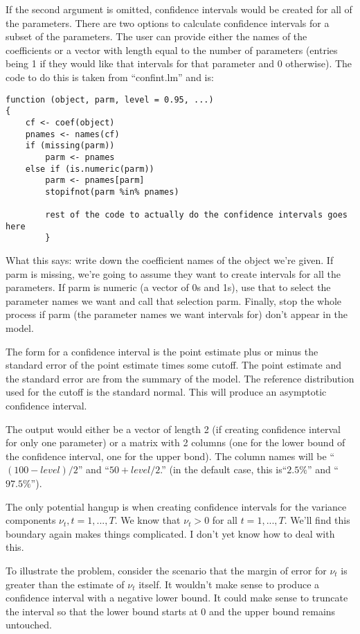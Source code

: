 \documentclass{article}
\begin{document}
If the second argument is omitted, confidence intervals would be created for all of the parameters. There are two options to calculate confidence intervals for a subset of the parameters. The user can provide either  the names of the coefficients or a vector with length equal to the number of parameters (entries being 1 if they would like that intervals for that parameter and 0 otherwise).  The code to do this is taken from ``confint.lm'' and is:
\begin{verbatim}
function (object, parm, level = 0.95, ...) 
{
    cf <- coef(object)
    pnames <- names(cf)
    if (missing(parm)) 
        parm <- pnames
    else if (is.numeric(parm)) 
        parm <- pnames[parm]
        stopifnot(parm %in% pnames)
        
        rest of the code to actually do the confidence intervals goes here
        }
\end{verbatim}
What this says: write down the coefficient names of the object we're given. If parm is missing, we're going to assume they want to create intervals for all the parameters.  If parm is numeric (a vector of 0s and 1s), use that to select the parameter names we want and call that selection parm.  Finally, stop the whole process if parm (the parameter names we want intervals for) don't appear in the model.

The form for a confidence interval is the point estimate plus or minus the standard error of the point estimate times some cutoff.  The point estimate and the standard error are from the summary of the model. The reference distribution used for the cutoff is the standard normal. This will produce an asymptotic confidence interval.

The output would either be a vector of length 2 (if creating confidence interval for only one parameter) or a matrix with 2 columns (one for the lower bound of the confidence interval, one for the upper bond). The column names will be ``$(100-level)/2$'' and ``$50+level/2 $.'' (in the default case, this is``$2.5\%$'' and ``$97.5\%$'').

The only potential hangup is when creating confidence intervals for the variance components $\nu_t, t=1,...,T$.  We know that $\nu_t >0$ for all $t=1,...,T$. We'll find this boundary again makes things complicated. I don't yet know how to deal with this.  

To illustrate the problem, consider the scenario that the margin of error for $\nu_t$ is greater than the estimate of $\nu_t$ itself. It wouldn't make sense to produce a confidence interval with a negative lower bound. It could make sense to truncate the interval so that the lower bound starts at 0 and the upper bound remains untouched.  
\end{document}
